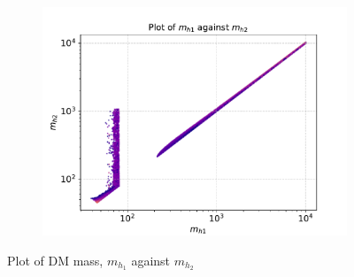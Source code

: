 \documentclass[12pt]{article}
\begin{document}
\begin{figure}[H]
\begin{subfigure}{\textwidth}
    \end{subfigure}
    \begin{subfigure}{\textwidth}
      \centering
      \includegraphics[width=0.5\columnwidth]{plots/MD1_MD2_cut1cut2cut3cut4.pdf}
    \end{subfigure}
    \caption{Plot of DM mass, $m_{h_1}$ against $m_{h_2}$}
    \label{fig:input noise}
\end{figure}
\end{document}
